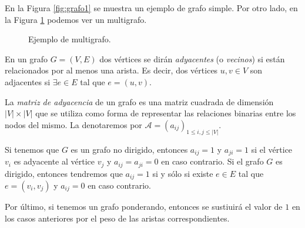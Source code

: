 \begin{exampleth}
En la Figura \ref{fig:grafo1} se muestra un ejemplo de grafo simple. Por otro lado, en la Figura \ref{fig:grafo4} podemos ver un multigrafo.
\end{exampleth}

\begin{figure}[H]
    \centering
{}
	\caption{Ejemplo de multigrafo.}
	\label{fig:grafo4}
\end{figure}

\begin{definition}\label{def:adjacency}
En un grafo $G=(V,E)$ dos vértices se dirán \emph{adyacentes} (o \emph{vecinos}) si están relacionados por al menos una arista. Es decir, dos vértices $u,v \in V$ son adjacentes si $\exists e \in E$ tal que $e = (u,v)$.

La \emph{matriz de adyacencia} de un grafo es una matriz cuadrada de dimensión $|V| \times |V|$ que se utiliza como forma de representar las relaciones binarias entre los nodos del mismo. La denotaremos por $\mathcal{A} = (a_{ij})_{1\leq i,j\leq |V|}$.

Si tenemos que $G$ es un grafo no dirigido, entonces $a_{ij} = 1$ y $a_{ji} = 1$ si el vértice $v_i$ es adyacente al vértice $v_j$ y $a_{ij} = a_{ji} = 0$ en caso contrario. Si el grafo $G$ es dirigido, entonces tendremos que $a_{ij} = 1$ si y sólo si existe $e \in E$ tal que $e = (v_i,v_j)$ y $a_{ij} = 0$ en caso contrario.

Por último, si tenemos un grafo ponderando, entonces se sustiuirá el valor de $1$ en los casos anteriores por el peso de las aristas correspondientes.
\end{definition}

